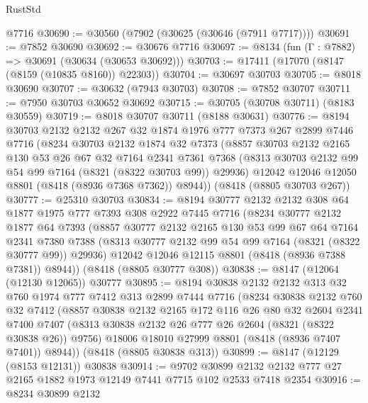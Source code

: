 \begin{lexlean}{RustStd}
\begin{coremodule}
    @7716
@30690 := @30560 (@7902 (@30625 (@30646 (@7911 @7717))))
@30691 := @7852 @30690
@30692 := @30676 @7716
@30697 := @8134 (fun (Γ : @7882) => @30691 (@30634 (@30653 @30692)))
@30703 := @17411 (@17070 (@8147 (@8159 (@10835 @8160)) @22303))
@30704 := @30697 @30703
@30705 := @8018 @30690
@30707 := @30632 (@7943 @30703)
@30708 := @7852 @30707
@30711 := @7950 @30703 @30652 @30692
@30715 := @30705 (@30708 @30711) (@8183 @30559)
@30719 := @8018 @30707 @30711 (@8188 @30631)
@30776 := @8194
    @30703
    @2132
    @2132
    @267
    @32
    @1874
    @1976
    @777
    @7373
    @267
    @2899
    @7446
    @7716
    (@8234
      @30703
      @2132
      @1874
      @32
      @7373
      (@8857
        @30703
        @2132
        @2165
        @130
        @53
        @26
        @67
        @32
        @7164
        @2341
        @7361
        @7368
        (@8313 @30703 @2132 @99 @54 @99 @7164 (@8321 (@8322 @30703 @99)) @29936)
        @12042
        @12046
        @12050
        @8801
        (@8418 (@8936 @7368 @7362))
        @8944))
    (@8418 (@8805 @30703 @267))
@30777 := @25310 @30703
@30834 := @8194
    @30777
    @2132
    @2132
    @308
    @64
    @1877
    @1975
    @777
    @7393
    @308
    @2922
    @7445
    @7716
    (@8234
      @30777
      @2132
      @1877
      @64
      @7393
      (@8857
        @30777
        @2132
        @2165
        @130
        @53
        @99
        @67
        @64
        @7164
        @2341
        @7380
        @7388
        (@8313 @30777 @2132 @99 @54 @99 @7164 (@8321 (@8322 @30777 @99)) @29936)
        @12042
        @12046
        @12115
        @8801
        (@8418 (@8936 @7388 @7381))
        @8944))
    (@8418 (@8805 @30777 @308))
@30838 := @8147 (@12064 (@12130 @12065)) @30777
@30895 := @8194
    @30838
    @2132
    @2132
    @313
    @32
    @760
    @1974
    @777
    @7412
    @313
    @2899
    @7444
    @7716
    (@8234
      @30838
      @2132
      @760
      @32
      @7412
      (@8857
        @30838
        @2132
        @2165
        @172
        @116
        @26
        @80
        @32
        @2604
        @2341
        @7400
        @7407
        (@8313 @30838 @2132 @26 @777 @26 @2604 (@8321 (@8322 @30838 @26)) @9756)
        @18006
        @18010
        @27999
        @8801
        (@8418 (@8936 @7407 @7401))
        @8944))
    (@8418 (@8805 @30838 @313))
@30899 := @8147 (@12129 (@8153 @12131)) @30838
@30914 := @9702
    @30899
    @2132
    @2132
    @777
    @27
    @2165
    @1882
    @1973
    @12149
    @7441
    @7715
    @102
    @2533
    @7418
    @2354
@30916 := @8234 @30899 @2132

\end{coremodule}
\end{lexlean}
